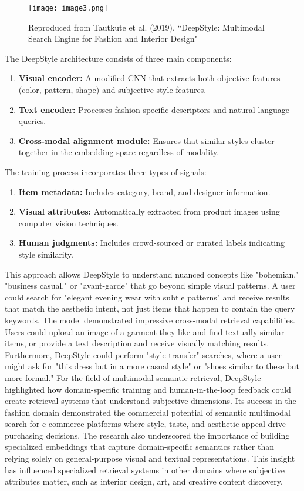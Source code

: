 \documentclass[conference]{IEEEtran}
\begin{document}
\begin{enumerate}
\begin{figure}
    \centering
    \texttt{[image: image3.png]}
    \caption{Reproduced from Tautkute et al. (2019), “DeepStyle: Multimodal Search Engine
for Fashion and Interior Design"}
    \label{fig:enter-label}
\end{figure}

The DeepStyle architecture consists of three main components:

\begin{enumerate}
    \item \textbf{Visual encoder:} A modified CNN that extracts both objective features (color, pattern, shape) and subjective style features.
    \item \textbf{Text encoder:} Processes fashion-specific descriptors and natural language queries.
    \item \textbf{Cross-modal alignment module:} Ensures that similar styles cluster together in the embedding space regardless of modality.
\end{enumerate}

The training process incorporates three types of signals:

\begin{enumerate}
    \item \textbf{Item metadata:} Includes category, brand, and designer information.
    \item \textbf{Visual attributes:} Automatically extracted from product images using computer vision techniques.
    \item \textbf{Human judgments:} Includes crowd-sourced or curated labels indicating style similarity.
\end{enumerate}

This approach allows DeepStyle to understand nuanced concepts like "bohemian," "business casual," or "avant-garde" that go beyond simple visual patterns. A user could search for "elegant evening wear with subtle patterns" and receive results that match the aesthetic intent, not just items that happen to contain the query keywords.
The model demonstrated impressive cross-modal retrieval capabilities. Users could upload an image of a garment they like and find textually similar items, or provide a text description and receive visually matching results. Furthermore, DeepStyle could perform "style transfer" searches, where a user might ask for "this dress but in a more casual style" or "shoes similar to these but more formal."
For the field of multimodal semantic retrieval, DeepStyle highlighted how domain-specific training and human-in-the-loop feedback could create retrieval systems that understand subjective dimensions. Its success in the fashion domain demonstrated the commercial potential of semantic multimodal search for e-commerce platforms where style, taste, and aesthetic appeal drive purchasing decisions.
The research also underscored the importance of building specialized embeddings that capture domain-specific semantics rather than relying solely on general-purpose visual and textual representations. This insight has influenced specialized retrieval systems in other domains where subjective attributes matter, such as interior design, art, and creative content discovery.   


\end{enumerate}
\end{document}
